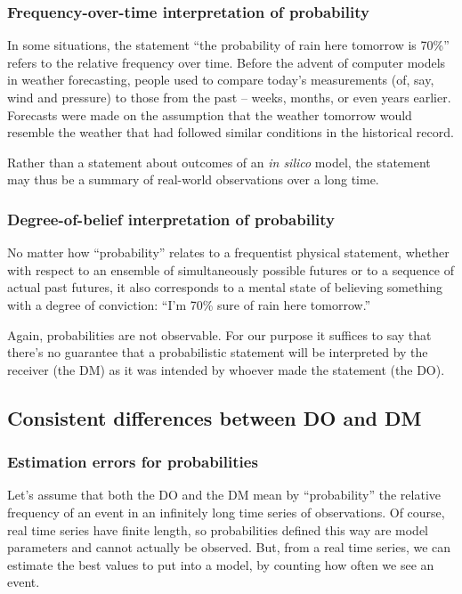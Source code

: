 \documentclass[a4paper, 12pt]{article}
\newcommand{\seclabel}[1]{\label{sec:#1}}
\begin{document}
\subsubsection*{Frequency-over-time interpretation of probability}
In some situations, the statement ``the probability of rain here tomorrow is 70\%'' refers to the relative frequency over time. Before the advent of computer models in weather forecasting, people used to compare today's measurements (of, say, wind and pressure) to those from the past -- weeks, months, or even years earlier. Forecasts were made on the assumption that the weather tomorrow would resemble the weather that had followed similar conditions in the historical record.

Rather than a statement about outcomes of an \textit{in silico} model, the statement may thus be a summary of real-world observations over a long time.

\subsubsection*{Degree-of-belief interpretation of probability}
No matter how ``probability'' relates to a frequentist physical statement, whether with respect to an ensemble of simultaneously possible futures or to a sequence of actual past futures, it also corresponds to a mental state of believing something with a degree of conviction: 
``I'm 70\% sure of rain here tomorrow.''

Again, probabilities are not observable.
For our purpose it suffices to say that there's no guarantee that a probabilistic statement will be interpreted by the receiver (the DM) as it was intended by whoever made the statement (the DO).

\subsection{Consistent differences between DO and DM \seclabel{condition2}}

\subsubsection*{Estimation errors for probabilities}
Let's assume that both the DO and the DM mean by ``probability'' the relative frequency of an event in an infinitely long time series of observations. Of course, real time series have finite length, so probabilities defined this way are model parameters and cannot actually be observed. But, from a real time series, we can estimate the best values to put into a model, by counting how often we see an event.
\end{document}
